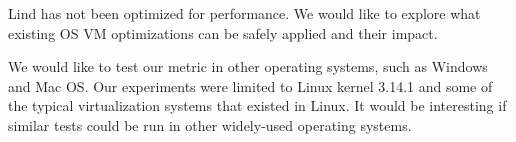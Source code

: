 Lind has not been optimized for performance.
We would like to explore what existing OS VM optimizations can be safely applied
and their impact.

We would like to test our metric in other operating systems, such as Windows and Mac OS.
Our experiments were limited to Linux kernel 3.14.1 and some of the typical virtualization systems that existed in Linux.
It would be interesting
if similar tests could be run in other widely-used operating systems.
